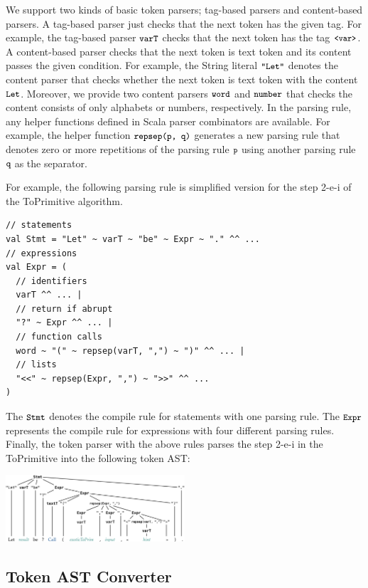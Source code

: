 We support two kinds of basic token parsers; tag-based parsers and
content-based parsers. A tag-based parser just checks that the next
token has the given tag. For example, the tag-based parser \( \texttt{\small varT} \)
checks that the next token has the tag \( \texttt{\small<var>} \). A content-based parser
checks that the next token is text token and its content passes the given condition.
For example, the String literal \( \texttt{\small"Let"} \) denotes the content parser
that checks whether the next token is text token with the content \( \texttt{\small Let} \).
Moreover, we provide two content parsers \( \texttt{\small word} \) and \( \texttt{\small number} \)
that checks the content consists of only alphabets or numbers, respectively.
In the parsing rule, any helper functions defined in Scala parser combinators
are available. For example, the helper function \( \texttt{\small repsep(p, q)} \) generates a new
parsing rule that denotes zero or more repetitions of the parsing rule \( \texttt{\small p} \)
using another parsing rule \( \texttt{\small q} \) as the separator.

For example, the following parsing rule is simplified version for
the step 2-e-i of the ToPrimitive algorithm.
\begin{lstlisting}[style=myScalastyle]
// statements
val Stmt = "Let" ~ varT ~ "be" ~ Expr ~ "." ^^ ...
// expressions
val Expr = (
  // identifiers
  varT ^^ ... |
  // return if abrupt
  "?" ~ Expr ^^ ... |
  // function calls
  word ~ "(" ~ repsep(varT, ",") ~ ")" ^^ ... |
  // lists
  "<<" ~ repsep(Expr, ",") ~ ">>" ^^ ...
)
\end{lstlisting}
The \( \texttt{\small Stmt} \) denotes the compile rule for statements with one
parsing rule. The \( \texttt{\small Expr} \) represents the compile rule for expressions
with four different parsing rules. Finally, the token parser with the above rules
parses the step 2-e-i in the ToPrimitive into the following
token AST:
\begin{center}
\includegraphics[width=0.5\textwidth]{img/token_ast.png}
\end{center}

\subsection{Token AST Converter}

